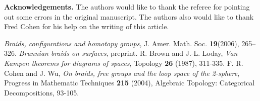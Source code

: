 \documentclass[10pt]{amsart}
\numberwithin{equation}{section}
\begin{document}
\noindent\small{\textbf{Acknowledgements.}} The authors would like to thank the referee for pointing out some errors in the original manuscript. The authors also would like to thank Fred Cohen for his help on the writing of this article.

\begin{thebibliography}{MMM}
 \textsl{Braids, configurations and homotopy groups}, \textrm{J. Amer. Math. Soc.} {\textbf{{19}}}{\textrm{({2006})}}, {\textrm{{265--326}}}.
 {\textsl{{Brunnian braids on surfaces}},} preprint.
 {\textrm{{R. Brown and J.-L. Loday}},} {\textsl{{Van Kampen theorems for diagrams of
spaces}},} {\textrm{{Topology}}} {\textbf{{26}}} {\textrm{({1987})}}, {\textrm{{311-335}}}.
{\textrm{{F. R. Cohen and J. Wu}},}
{\textsl{{On braids, free groups and the loop space of the 2-sphere}},}
{\textrm{{Progress in Mathematic Techniques}}}
{\textbf{{215}}}
{\textrm{({2004})}}, Algebraic Topology: Categorical Decompositions, {\textrm{{93-105}}}.


\end{thebibliography}
\end{document}
